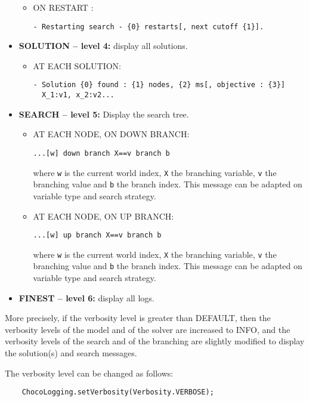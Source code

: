 \begin{itemize}
\begin{itemize}
			\item ON RESTART : 
			\begin{lstlisting}
- Restarting search - {0} restarts[, next cutoff {1}].
			\end{lstlisting}
		\end{itemize}

	\item \textbf{SOLUTION -- level 4:} display all solutions.
		\begin{itemize}
			\item AT EACH SOLUTION:
			\begin{lstlisting}
- Solution {0} found : {1} nodes, {2} ms[, objective : {3}]
  X_1:v1, x_2:v2...
			\end{lstlisting}
		\end{itemize}

	\item \textbf{SEARCH -- level 5:} Display the search tree.
		\begin{itemize}
			\item AT EACH NODE, ON DOWN BRANCH:
			\begin{lstlisting}
...[w] down branch X==v branch b
			\end{lstlisting}
where \texttt{w} is the current world index, \texttt{X} the branching variable, \texttt{v} the branching value and \texttt{b} the branch index. This message can be adapted on variable type and search strategy.

			\item AT EACH NODE, ON UP BRANCH:
			\begin{lstlisting}
...[w] up branch X==v branch b
			\end{lstlisting}
where \texttt{w} is the current world index, \texttt{X} the branching variable, \texttt{v} the branching value and \texttt{b} the branch index. This message can be adapted on variable type and search strategy.
		\end{itemize}

	\item \textbf{FINEST -- level 6:} display all logs.

\end{itemize}

More precisely, if the verbosity level is greater than DEFAULT, then the verbosity levels of the model and of the solver are increased to INFO, and the verbosity levels of the search and of the branching are slightly modified to display the solution(s) and search messages.

The verbosity level can be changed as follows:
\begin{lstlisting}
	ChocoLogging.setVerbosity(Verbosity.VERBOSE);
\end{lstlisting}


